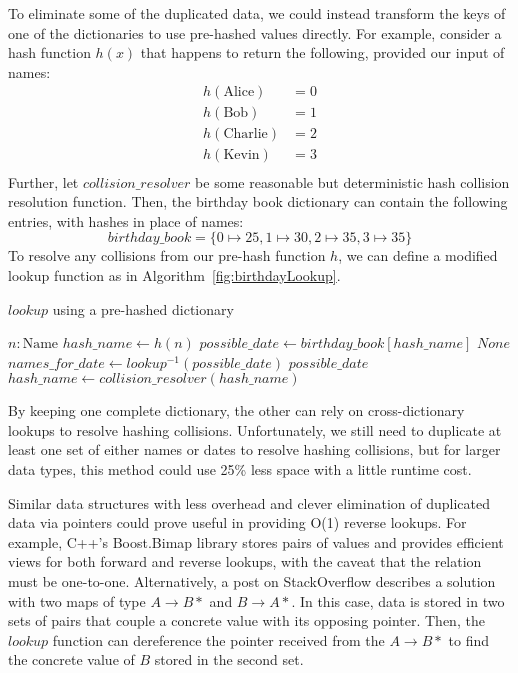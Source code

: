 \documentclass{article}
\begin{document}
To eliminate some of the duplicated data, we could instead transform the keys of one of the dictionaries to use pre-hashed values directly. For example, consider a hash function $h(x)$ that happens to return the following, provided our input of names:
\begin{align*}
h(\text{Alice}) &= 0\\
h(\text{Bob}) &= 1\\
h(\text{Charlie}) &= 2\\
h(\text{Kevin}) &= 3\\
\end{align*}
Further, let $collision\_resolver$ be some reasonable but deterministic hash collision resolution function. Then, the birthday book dictionary can contain the following entries, with hashes in place of names:
\[birthday\_book = \{0 \mapsto 25, 1 \mapsto 30, 2 \mapsto 35, 3 \mapsto 35 \}\]
To resolve any collisions from our pre-hash function $h$, we can define a modified lookup function as in Algorithm~\ref{fig:birthdayLookup}.

\begin{algorithm}
  \caption{$lookup$ using a pre-hashed dictionary}
  \begin{algorithmic}
    \Require $n: \text{Name}$
    \State $hash\_name \gets h(n)$
      \State $possible\_date \gets birthday\_book[hash\_name]$
        \Return $None$
      \EndIf
      \State $names\_for\_date \gets lookup^{-1}(possible\_date)$
        \Return $possible\_date$
      \EndIf
      \State $hash\_name \gets collision\_resolver(hash\_name)$
    \EndWhile
  \end{algorithmic}
  \label{fig:birthdayLookup}
\end{algorithm}

By keeping one complete dictionary, the other can rely on cross-dictionary lookups to resolve hashing collisions. Unfortunately, we still need to duplicate at least one set of either names or dates to resolve hashing collisions, but for larger data types, this method could use 25\% less space with a little runtime cost.

Similar data structures with less overhead and clever elimination of duplicated data via pointers could prove useful in providing O(1) reverse lookups. For example, C++'s Boost.Bimap library \cite{boostBimap1, boostBimap2} stores pairs of values and provides efficient views for both forward and reverse lookups, with the caveat that the relation must be one-to-one. Alternatively, a post on StackOverflow \cite{bimapStackOverflow} describes a solution with two maps of type $A \rightarrow B*$ and $B \rightarrow A*$. In this case, data is stored in two sets of pairs that couple a concrete value with its opposing pointer. Then, the $lookup$ function can dereference the pointer received from the $A \rightarrow B*$ to find the concrete value of $B$ stored in the second set.
\end{document}

